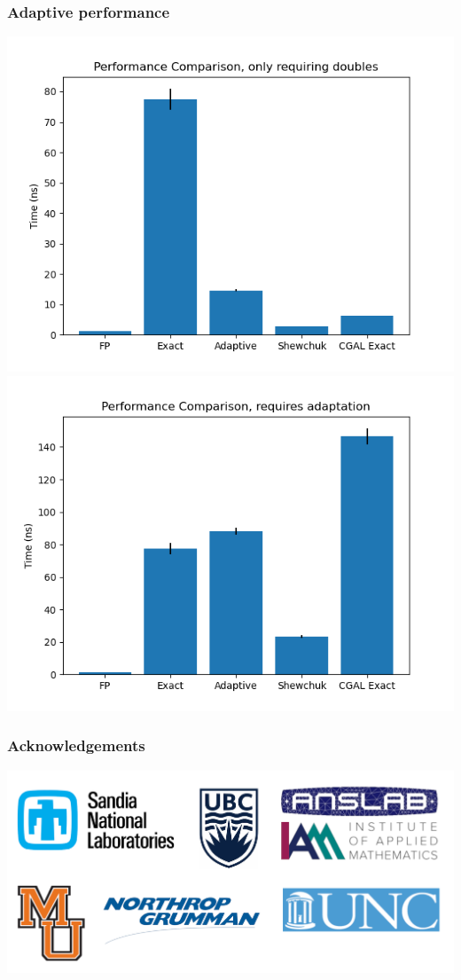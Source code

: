 \documentclass{beamer}
\begin{document}
\begin{frame}[fragile]
  \frametitle{Adaptive performance}
  \includegraphics[width=0.475\linewidth]{images/adaptive_benchmark_fp.png}
  \hspace{1mm}
  \includegraphics[width=0.475\linewidth]{images/adaptive_benchmark_exact.png}
\end{frame}

\begin{frame}
  \frametitle{Acknowledgements}
  \begin{centering}
    \hspace{5mm}\includegraphics[width=1.0\linewidth]{images/collage.png}
  \end{centering}
\end{frame}
\end{document}
